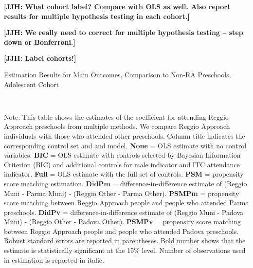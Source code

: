 \textbf{[JJH: What cohort label? Compare with OLS as well. Also report results for multiple hypothesis testing in each cohort.]}

\textbf{[JJH: We really need to correct for multiple hypothesis testing -- step down or Bonferroni.]}

\textbf{[JJH: Label cohorts!]}

\begin{table}[H] \caption{Estimation Results for Main Outcomes, Comparison to Non-RA Preschools, Adolescent Cohort} \label{ols-M-adol-reg-pres}
\scalebox{0.66}{}
\vspace{1ex} \\
\footnotesize\raggedright{Note: This table shows the estimates of the coefficient for attending Reggio Approach preschools from multiple methods. We compare Reggio Approach individuals with those who attended other preschools. Column title indicates the corresponding control set and and model. \textbf{None} = OLS estimate with no control variables. \textbf{BIC} = OLS estimate with controls selected by Bayesian Information Criterion (BIC) and additional controls for male indicator and ITC attendance indicator. \textbf{Full} = OLS estimate with the full set of controls. \textbf{PSM} =  propensity score matching estimation. \textbf{DidPm} = difference-in-difference estimate of (Reggio Muni - Parma Muni) - (Reggio Other - Parma Other). \textbf{PSMPm} = propensity score matching between Reggio Approach people and people who attended Parma preschools. \textbf{DidPv} = difference-in-difference estimate of (Reggio Muni - Padova Muni) - (Reggio Other - Padova Other). \textbf{PSMPv} = propensity score matching between Reggio Approach people and people who attended Padova preschools. Robust standard errors are reported in parentheses. Bold number shows that the estimate is statistically significant at the 15\% level. Number of observations used in estimation is reported in italic.}
\end{table}


